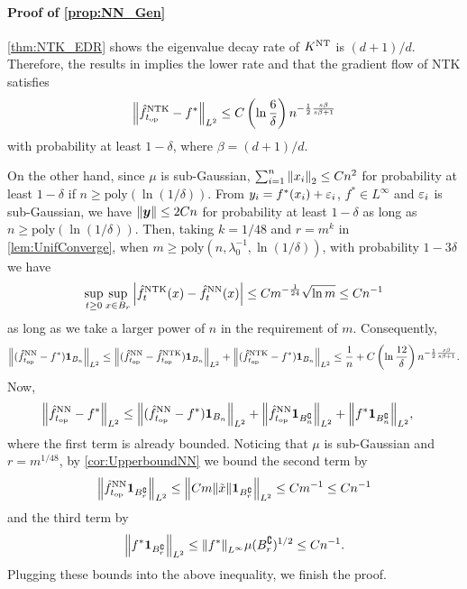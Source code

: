 \paragraph{Proof of \cref{prop:NN_Gen}}
\cref{thm:NTK_EDR} shows the eigenvalue decay rate of $K^{\mathrm{NT}}$ is $(d+1)/d$.
Therefore, the results in \citet{lin2018_OptimalRates} implies the lower rate and that the gradient flow of NTK satisfies
\begin{align}
  \label{eq:E_Proof1}
  \norm{\hat{f}^{\mathrm{NTK}}_{t_{\mathrm{op}}} - f^*}_{L^2} \leq C \left( \ln\frac{6}{\delta} \right) n^{-\frac{1}{2}\frac{s\beta}{s\beta + 1}}
\end{align}
with probability at least $1-\delta$, where $\beta = (d+1)/d$.

On the other hand, since $\mu$ is sub-Gaussian, $\sum_{i=1}^n \norm{x_i}_2 \leq C n^2$
for probability at least $1-\delta$ if $n \geq \mathrm{poly}(\ln(1/\delta))$.
From $y_i = f^*(x_i) + \varepsilon_i$, $f^* \in L^\infty$ and $\varepsilon_i$ is sub-Gaussian,
we have $\norm{\bm{y}} \leq 2C n$ for probability at least $1-\delta$ as long as $n \geq \mathrm{poly}(\ln(1/\delta))$.
Then, taking $k=1/48$ and $r = m^{k}$ in \cref{lem:UnifConverge},
when $m \geq \mathrm{poly}(n,\lambda_0^{-1},\ln(1/\delta))$,
with probability $1-3\delta$ we have
\begin{align*}
  \sup_{t\geq 0} \sup_{x \in B_r} \abs{\hat{f}^{\mathrm{NTK}}_t(x) - \hat{f}^{\mathrm{NN}}_t(x)} \leq C m^{-\frac{1}{24}}\sqrt {\ln m} \leq C n^{-1}
\end{align*}
as long as we take a larger power of $n$ in the requirement of $m$.
Consequently,
\begin{align*}
  \norm{(\hat{f}^{\mathrm{NN}}_{t_{\mathrm{op}}} - f^*)\bm{1}_{B_n}}_{L^2}
  \leq \norm{(\hat{f}^{\mathrm{NN}}_{t_{\mathrm{op}}} - \hat{f}^{\mathrm{NTK}}_{t_{\mathrm{op}}})\bm{1}_{B_n}}_{L^2} + \norm{(\hat{f}^{\mathrm{NTK}}_{t_{\mathrm{op}}} - f^*)\bm{1}_{B_n}}_{L^2}
  \leq  \frac{1}{n} + C \left( \ln\frac{12}{\delta} \right) n^{-\frac{1}{2}\frac{s\beta}{s\beta + 1}}.
\end{align*}
Now,
\begin{align*}
  \norm{\hat{f}^{\mathrm{NN}}_{t_{\mathrm{op}}} - f^*}_{L^2}
&\leq \norm{(\hat{f}^{\mathrm{NN}}_{t_{\mathrm{op}}} - f^*)\bm{1}_{B_n}}_{L^2}
  + \norm{\hat{f}^{\mathrm{NN}}_{t_{\mathrm{op}}}\bm{1}_{B_n^\complement}}_{L^2}
  + \norm{f^* \bm{1}_{B_n^\complement}}_{L^2},
\end{align*}
where the first term is already bounded.
Noticing that $\mu$ is sub-Gaussian and $r = m^{1/48}$, by \cref{cor:UpperboundNN} we bound the second term by
\begin{align*}
  \norm{\hat{f}^{\mathrm{NN}}_{t_{\mathrm{op}}}\bm{1}_{B_r^\complement}}_{L^2}
  \leq \norm{C m \norm{\tilde{x}} \bm{1}_{B_r^\complement}}_{L^2}
  \leq C m^{-1} \leq Cn^{-1}
\end{align*}
and the third term by
\begin{align*}
  \norm{f^* \bm{1}_{B_r^\complement}}_{L^2} \leq \norm{f^*}_{L^\infty} \mu(B_r^\complement)^{1/2} \leq C n^{-1}.
\end{align*}
Plugging these bounds into the above inequality, we finish the proof.

